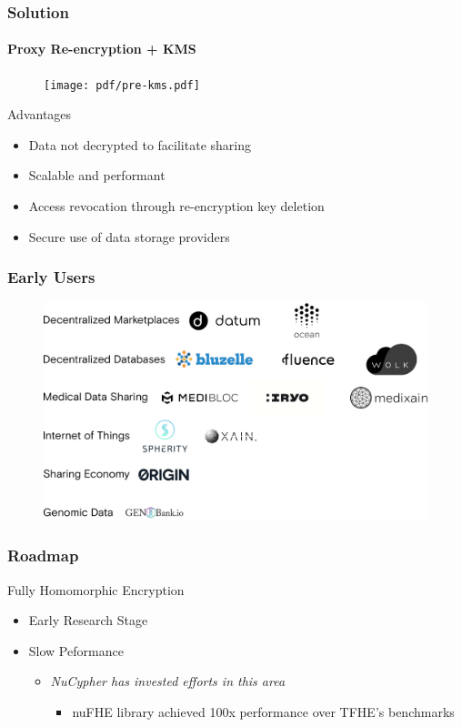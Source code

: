 \documentclass[xetex,mathsans,sans,aspectratio=169]{beamer}
\begin{document}
    \begin{frame}
        \frametitle{Solution}
        \framesubtitle{Proxy Re-encryption + KMS}
        \begin{figure}
            \centering
            \texttt{[image: pdf/pre-kms.pdf]}
        \end{figure}

        Advantages
        \begin{itemize}
            \item Data not decrypted to facilitate sharing
            \item Scalable and performant
            \item Access revocation through re-encryption key deletion
            \item Secure use of data storage providers
        \end{itemize}
    \end{frame}

    \begin{frame}
      \frametitle{Early Users}
      \begin{figure}
           \includegraphics[width=11.5cm]{pdf/projects.pdf}
      \end{figure}
    \end{frame}

    \begin{frame}
      \frametitle{Roadmap}
       Fully Homomorphic Encryption
       \begin{itemize}
           \item Early Research Stage
           \item Slow Peformance
           \begin{itemize}
               \item \emph{NuCypher has invested efforts in this area}
                 \begin{itemize}
                   \item nuFHE library achieved 100x performance over TFHE’s benchmarks
                 \end{itemize}
           \end{itemize}
       \end{itemize}
     \end{frame}
    
\end{document}
